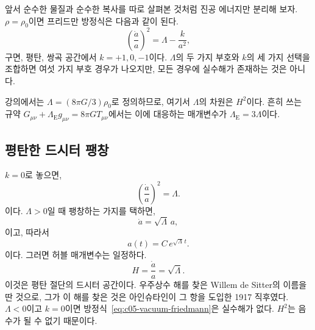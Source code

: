 앞서 순수한 물질과 순수한 복사를 따로 살펴본 것처럼 진공 에너지만 분리해 보자. \(\rho=\rho_0\)이면 프리드만 방정식은 다음과 같이 된다.
\begin{equation}
\left(\frac{\dot a}{a}\right)^2=\Lambda-\frac{k}{a^2},
\label{eq:c05-vacuum-friedmann}
\end{equation}
구면, 평탄, 쌍곡 공간에서 \(k=+1,0,-1\)이다. \(\Lambda\)의 두 가지 부호와 \(k\)의 세 가지 선택을 조합하면 여섯 가지 부호 경우가 나오지만, 모든 경우에 실수해가 존재하는 것은 아니다.

\begin{remark}
강의에서는 \(\Lambda=(8\pi G/3)\rho_0\)로 정의하므로, 여기서 \(\Lambda\)의 차원은 \(H^2\)이다. 흔히 쓰는 규약 \(G_{\mu\nu}+\Lambda_{\mathrm E}g_{\mu\nu}=8\pi G T_{\mu\nu}\)에서는 이에 대응하는 매개변수가 \(\Lambda_{\mathrm E}=3\Lambda\)이다.
\end{remark}

\subsection{평탄한 드시터 팽창}

\(k=0\)로 놓으면,
\begin{equation}
\left(\frac{\dot a}{a}\right)^2=\Lambda.
\end{equation}
이다. \(\Lambda>0\)일 때 팽창하는 가지를 택하면,
\begin{equation}
\dot a=\sqrt{\Lambda}\,a,
\end{equation}
이고, 따라서
\begin{equation}
a(t)=C\,e^{\sqrt{\Lambda}\,t}.
\end{equation}
이다. 그러면 허블 매개변수는 일정하다.
\begin{equation}
H=\frac{\dot a}{a}=\sqrt{\Lambda}.
\end{equation}
이것은 평탄 절단의 드시터 공간이다. 우주상수 해를 찾은 Willem de Sitter의 이름을 딴 것으로, 그가 이 해를 찾은 것은 아인슈타인이 그 항을 도입한 1917 직후였다. \(\Lambda<0\)이고 \(k=0\)이면 방정식~\eqref{eq:c05-vacuum-friedmann}은 실수해가 없다. \(H^2\)는 음수가 될 수 없기 때문이다.

\begin{classroomqa}
\end{classroomqa}

